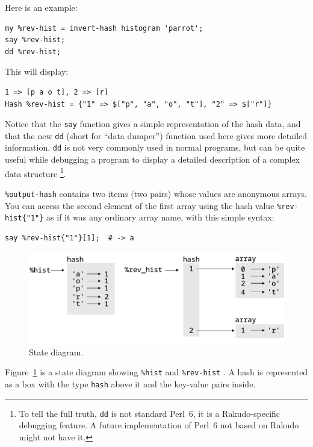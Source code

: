 Here is an example:

\begin{verbatim}
my %rev-hist = invert-hash histogram 'parrot';
say %rev-hist;
dd %rev-hist;
\end{verbatim}

This will display:

\begin{verbatim}
1 => [p a o t], 2 => [r]
Hash %rev-hist = {"1" => $["p", "a", "o", "t"], "2" => $["r"]}
\end{verbatim}

Notice that the {\tt say} function gives a simple representation 
of the hash data, and that the new {\tt dd} (short for ``data 
dumper'') function used here gives more detailed information. 
{\tt dd} is not very commonly used in normal programs, but 
can be quite useful while debugging a program to display a 
detailed description of a complex data structure 
\footnote{To tell the full truth, {\tt dd} is not standard 
Perl~6, it is a Rakudo-specific debugging feature. A future 
implementation of Perl~6 not based on Rakudo might not have 
it.}.

\verb'%output-hash' contains two items (two pairs) whose 
values are anonymous arrays. You can access the second 
element of the first array using the hash value 
\verb'%rev-hist{"1"}' as if it was any ordinary array name, 
with this simple syntax:

\begin{verbatim}
say %rev-hist{"1"}[1];  # -> a
\end{verbatim}


\begin{figure}
\centerline
{\includegraphics[scale=0.8]{figs/hash1.pdf}}
\caption{State diagram.}
\label{fig.hash1}
\end{figure}

Figure~\ref{fig.hash1} is a state diagram showing \verb'%hist'  and \verb'%rev-hist' .
A hash is represented as a box with the type {\tt hash} above it
and the key-value pairs inside.

